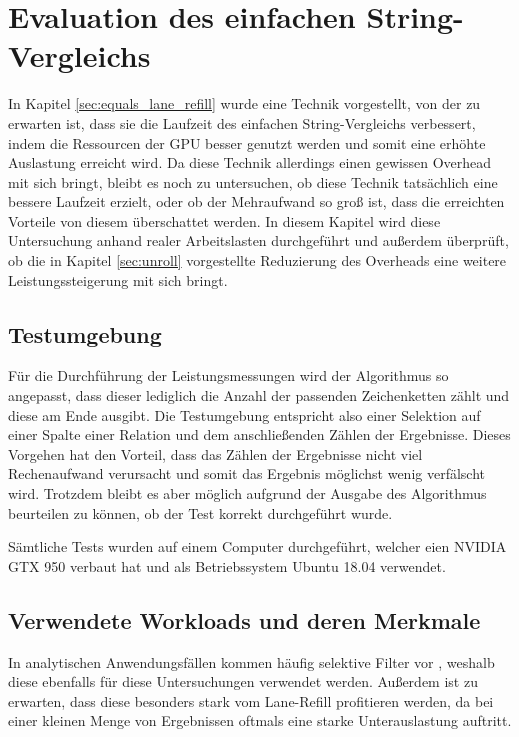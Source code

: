 \chapter{Evaluation des einfachen String-Vergleichs}

In Kapitel \ref{sec:equals_lane_refill} wurde eine Technik vorgestellt, von der zu erwarten ist, dass sie die Laufzeit des einfachen String-Vergleichs verbessert, indem die Ressourcen der GPU besser genutzt werden und somit eine erhöhte Auslastung erreicht wird.
Da diese Technik allerdings einen gewissen Overhead mit sich bringt, bleibt es noch zu untersuchen, ob diese Technik tatsächlich eine bessere Laufzeit erzielt, oder ob der Mehraufwand so groß ist, dass die erreichten Vorteile von diesem überschattet werden.
In diesem Kapitel wird diese Untersuchung anhand realer Arbeitslasten durchgeführt und außerdem überprüft, ob die in Kapitel \ref{sec:unroll} vorgestellte Reduzierung des Overheads eine weitere Leistungssteigerung mit sich bringt.

\section{Testumgebung}

Für die Durchführung der Leistungsmessungen wird der Algorithmus so angepasst, dass dieser lediglich die Anzahl der passenden Zeichenketten zählt und diese am Ende ausgibt.
Die Testumgebung entspricht also einer Selektion auf einer Spalte einer Relation und dem anschließenden Zählen der Ergebnisse.
Dieses Vorgehen hat den Vorteil, dass das Zählen der Ergebnisse nicht viel Rechenaufwand verursacht und somit das Ergebnis möglichst wenig verfälscht wird.
Trotzdem bleibt es aber möglich aufgrund der Ausgabe des Algorithmus beurteilen zu können, ob der Test korrekt durchgeführt wurde.

Sämtliche Tests wurden auf einem Computer durchgeführt, welcher eien NVIDIA GTX 950 verbaut hat und als Betriebssystem Ubuntu 18.04 verwendet.

\section{Verwendete Workloads und deren Merkmale}

In analytischen Anwendungsfällen kommen häufig selektive Filter vor \cite{Boncz2013}, weshalb diese ebenfalls für diese Untersuchungen verwendet werden.
Außerdem ist zu erwarten, dass diese besonders stark vom Lane-Refill profitieren werden, da bei einer kleinen Menge von Ergebnissen oftmals eine starke Unterauslastung auftritt.


